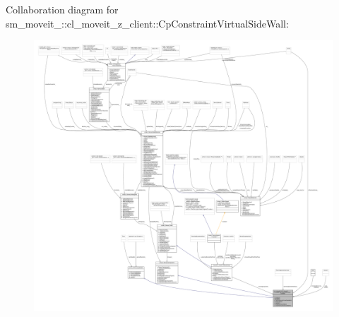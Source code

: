 Collaboration diagram for sm\+\_\+moveit\+\_\+:\+:cl\+\_\+moveit\+\_\+z\+\_\+client\+:\+:Cp\+Constraint\+Virtual\+Side\+Wall\+:
\nopagebreak
\begin{figure}[H]
\begin{center}
\leavevmode
\includegraphics[width=350pt]{classsm__moveit__4_1_1cl__moveit__z__client_1_1CpConstraintVirtualSideWall__coll__graph}
\end{center}
\end{figure}
